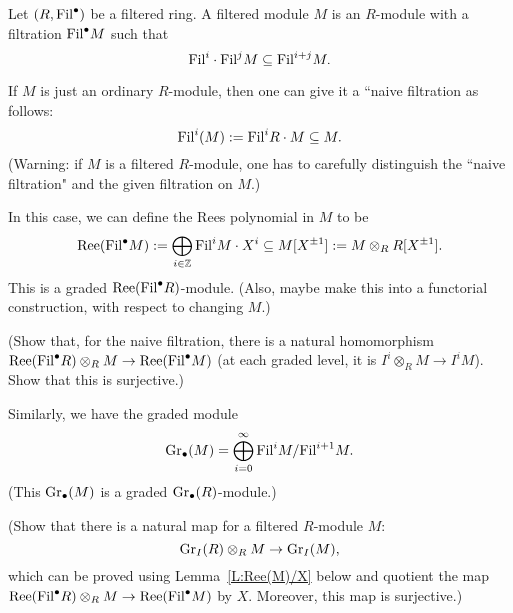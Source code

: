 	\begin{definition}
		Let $(R, \mathrm{Fil}^\bullet)$ be a filtered ring. A filtered module $M$ is an $R$-module with a filtration $\mathrm{Fil}^\bullet M$ such that
		$$
		\mathrm{Fil}^i \cdot \mathrm{Fil}^j M \subseteq \mathrm{Fil}^{i+j} M.
		$$
		
		If $M$ is just an ordinary $R$-module, then one can give it a ``naive filtration as follows:
		$$
		\mathrm{Fil}^i(M): = \mathrm{Fil}^iR \cdot M \subseteq M.
		$$
		(Warning: if $M$ is a filtered $R$-module, one has to carefully distinguish the ``naive filtration" and the given filtration on $M$.)
		
		In this case, we can define the Rees polynomial in $M$ to be
		$$
		\mathrm{Ree}(\mathrm{Fil}^\bullet M): = \bigoplus_{i\in \mathbb{Z}} \mathrm{Fil}^iM \cdot X^i \subseteq M[X^{\pm 1}]: = M \otimes_R R[X^{\pm 1}].
		$$
		This is a graded $\mathrm{Ree}(\mathrm{Fil}^\bullet R) $-module.
		(Also, maybe make this into a functorial construction, with respect to changing $M$.)
		
		(Show that, for the naive filtration,  there is a natural homomorphism $\mathrm{Ree}(\mathrm{Fil}^\bullet R) \otimes_R M \to \mathrm{Ree}(\mathrm{Fil}^\bullet M)$ (at each graded level, it is $I^i \otimes_R M \to I^iM$). Show that this is surjective.)
		
		Similarly, we have the graded module
		$$
		\mathrm{Gr}_\bullet(M)= \bigoplus_{i=0}^{\infty} \mathrm{Fil}^iM/\mathrm{Fil}^{i+1}M.
		$$
		(This $\mathrm{Gr}_\bullet (M)$ is a graded $\mathrm{Gr}_\bullet(R)$-module.)
		
		(Show that there is a natural map for a filtered $R$-module $M$: 
		\begin{equation}
			\label{E:M otimes R GrIR to GrI(M)}
			\mathrm{Gr}_I(R)  \otimes _R M  \to \mathrm{Gr}_I(M),
		\end{equation}
		which can be proved using Lemma~\ref{L:Ree(M)/X} below and quotient the map $\mathrm{Ree}(\mathrm{Fil}^\bullet R) \otimes_RM \to \mathrm{Ree}(\mathrm{Fil}^\bullet M)$ by $X$. Moreover, this map is surjective.)
	\end{definition}
	
